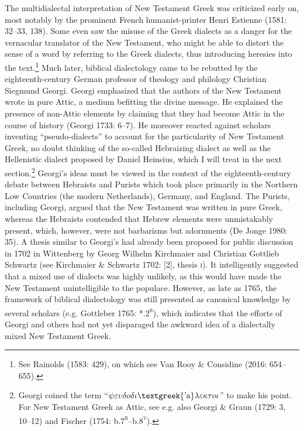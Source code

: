 \documentclass[12pt]{article}
\newenvironment{styleStandard}{\renewcommand\baselinestretch{1.25}\setlength\leftskip{0in}\setlength\rightskip{0in}\setlength\parindent{0.1972in}\setlength\parfillskip{0pt plus 1fil}\setlength\parskip{0in plus 1pt}\writerlistparindent\writerlistleftskip\leavevmode\normalfont\normalsize\writerlistlabel\ignorespaces}{\unskip\vspace{0in plus 1pt}\par}
\newcommand\writerlistleftskip{}
\newcommand\writerlistparindent{}
\newcommand\writerlistlabel{}
\begin{document}
\begin{styleStandard}
The multidialectal interpretation of New Testament Greek was criticized early on, most notably by the prominent French humanist-printer Henri Estienne (1581: 32–33, 138). Some even saw the misuse of the Greek dialects as a danger for the vernacular translator of the New Testament, who might be able to distort the sense of a word by referring to the Greek dialects, thus introducing heresies into the text.\footnote{ See Rainolds (1583: 429), on which see Van Rooy \& Considine (2016: 654–655).} Much later, biblical dialectology came to be rebutted by the eighteenth-century German professor of theology and philology Christian Siegmund Georgi. Georgi emphasized that the authors of the New Testament wrote in pure Attic, a medium befitting the divine message. He explained the presence of non-Attic elements by claiming that they had become Attic in the course of history (Georgi 1733: 6–7). He moreover reacted against scholars inventing “pseudo-dialects” to account for the particularity of New Testament Greek, no doubt thinking of the so-called Hebraizing dialect as well as the Hellenistic dialect proposed by Daniel Heinsius, which I will treat in the next section.\footnote{ Georgi coined the term “$\psi \varepsilon \upsilon \delta o\delta \iota \text{\textgreek{'a}}\lambda \varepsilon \kappa \tau o\iota $” to make his point. For New Testament Greek as Attic, see e.g. also Georgi \& Graun (1729: 3, 10–12) and Fischer (1754: b.7\textsc{\textsuperscript{r}}–b.8\textsc{\textsuperscript{v}}).} Georgi’s ideas must be viewed in the context of the eighteenth-century debate between Hebraists and Purists which took place primarily in the Northern Low Countries (the modern Netherlands), Germany, and England. The Purists, including Georgi, argued that the New Testament was written in pure Greek, whereas the Hebraists contended that Hebrew elements were unmistakably present, which, however, were not barbarisms but adornments (De Jonge 1980: 35). A thesis similar to Georgi’s had already been proposed for public discussion in 1702 in Wittenberg by Georg Wilhelm Kirchmaier and Christian Gottlieb Schwartz (see Kirchmaier \& Schwartz 1702: [2], thesis \textsc{i}). It intelligently suggested that a mixed use of dialects was highly unlikely, as this would have made the New Testament unintelligible to the populace. However, as late as 1765, the framework of biblical dialectology was still presented as canonical knowledge by several scholars (e.g. Gottleber 1765: *.2\textsc{\textsuperscript{r}}), which indicates that the efforts of Georgi and others had not yet disparaged the awkward idea of a dialectally mixed New Testament Greek.
\end{styleStandard}
\end{document}
